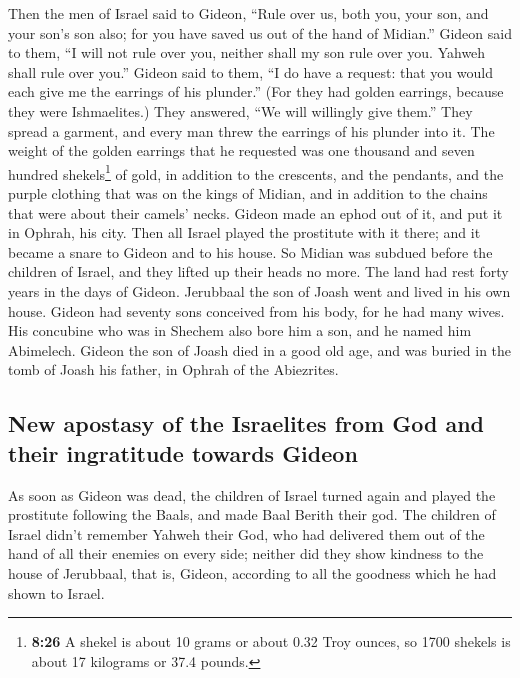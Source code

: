  Then the men of Israel said to Gideon, ``Rule over us,
both you, your son, and your son's son also; for you have saved us out
of the hand of Midian.''  Gideon said to them, ``I will
not rule over you, neither shall my son rule over you. Yahweh shall rule
over you.''  Gideon said to them, ``I do have a request:
that you would each give me the earrings of his plunder.'' (For they had
golden earrings, because they were Ishmaelites.)  They
answered, ``We will willingly give them.'' They spread a garment, and
every man threw the earrings of his plunder into it.  The
weight of the golden earrings that he requested was one thousand and
seven hundred shekels\footnote{\textbf{8:26} A shekel is about 10 grams
  or about 0.32 Troy ounces, so 1700 shekels is about 17 kilograms or
  37.4 pounds.} of gold, in addition to the crescents, and the pendants,
and the purple clothing that was on the kings of Midian, and in addition
to the chains that were about their camels' necks. 
Gideon made an ephod out of it, and put it in Ophrah, his city. Then all
Israel played the prostitute with it there; and it became a snare to
Gideon and to his house.  So Midian was subdued before
the children of Israel, and they lifted up their heads no more. The land
had rest forty years in the days of Gideon.  Jerubbaal
the son of Joash went and lived in his own house.  Gideon
had seventy sons conceived from his body, for he had many wives.
 His concubine who was in Shechem also bore him a son,
and he named him Abimelech.  Gideon the son of Joash died
in a good old age, and was buried in the tomb of Joash his father, in
Ophrah of the Abiezrites.

\hypertarget{new-apostasy-of-the-israelites-from-god-and-their-ingratitude-towards-gideon}{%
\subsection{New apostasy of the Israelites from God and their
ingratitude towards
Gideon}\label{new-apostasy-of-the-israelites-from-god-and-their-ingratitude-towards-gideon}}

 As soon as Gideon was dead, the children of Israel
turned again and played the prostitute following the Baals, and made
Baal Berith their god.  The children of Israel didn't
remember Yahweh their God, who had delivered them out of the hand of all
their enemies on every side;  neither did they show
kindness to the house of Jerubbaal, that is, Gideon, according to all
the goodness which he had shown to Israel.


